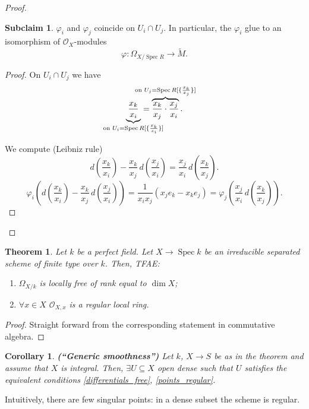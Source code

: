 \documentclass[12pt]{article}
\DeclareMathOperator{\Spec}{Spec}
\newtheorem*{theorem}{Theorem}
\newtheorem*{corollary}{Corollary}
\theoremstyle{definition}
\newtheorem{subclaim}{Subclaim}
\begin{document}
\begin{proof}
\begin{subclaim}
$\varphi_i$ and $\varphi_j$ coincide on $U_i\cap U_j$. In particular, the $\varphi_i$ glue to an isomorphism of $\mathcal{O}_X$-modules
\[\varphi:\Omega_{X/\Spec R}\longrightarrow\widetilde{M}.\]
\end{subclaim}

\begin{proof}
On $U_i\cap U_j$ we have
\[\underbrace{\frac{x_k}{x_i}}_{\mathclap{\text{on }U_i=\Spec R[\{\frac{x_k}{x_i}\}]}}=\overbrace{\frac{x_k}{x_j}\cdot\frac{x_j}{x_i}}^{\mathclap{\text{on }U_j=\Spec R[\{\frac{x_k}{x_j}\}]}}.\]

We compute (Leibniz rule)
\[d\left(\frac{x_k}{x_i}\right)-\frac{x_k}{x_j}\,d\left(\frac{x_j}{x_i}\right)=\frac{x_j}{x_i}\,d\left(\frac{x_k}{x_j}\right).\]
\[\varphi_i\left(d\left(\frac{x_k}{x_i}\right)-\frac{x_k}{x_j}\,d\left(\frac{x_j}{x_i}\right)\right)=\frac{1}{x_ix_j}(x_je_k-x_ke_j)=\varphi_j\left(\frac{x_j}{x_i}\,d\left(\frac{x_k}{x_j}\right)\right).\]
\end{proof}
\end{proof}

\begin{theorem}
Let $k$ be a perfect field. Let $X\rightarrow\Spec k$ be an irreducible separated scheme of finite type over $k$. Then, TFAE:
\begin{enumerate}[label=\arabic*)]
\item\label{differentials_free} $\Omega_{X/k}$ is locally free of rank equal to $\dim X$;
\item\label{points_regular} $\forall x\in X$ $\mathcal{O}_{X,x}$ is a regular local ring.
\end{enumerate}
\end{theorem}

\begin{proof}
Straight forward from the corresponding statement in commutative algebra.
\end{proof}

\begin{corollary}
\emph{\textbf{(``Generic smoothness'')}} Let $k$, $X\rightarrow S$ be as in the theorem and assume that $X$ is integral. Then, $\exists U\subseteq X$ open dense such that $U$ satisfies the equivalent conditions \ref{differentials_free}, \ref{points_regular}.
\end{corollary}

Intuitively, there are few singular points: in a dense subset the scheme is regular.
\end{document}
